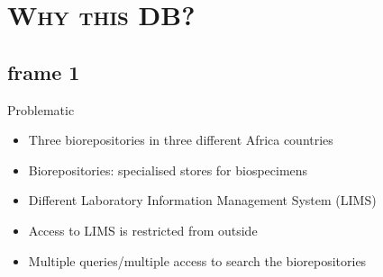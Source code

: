 \documentclass[xcolor=x11names,compress]{beamer}
\renewcommand{\(}{\begin{columns}}
\renewcommand{\)}{\end{columns}}
\newcommand{\<}[1]{\begin{column}{#1}}
\renewcommand{\>}{\end{column}}
\begin{document}
\section{\scshape Why this DB?}


\subsection{frame 1}
\begin{frame}{Problematic}
\begin{itemize}
\item Three biorepositories in three different Africa countries
\item Biorepositories: specialised stores for biospecimens
\item Different Laboratory Information Management System (LIMS) 
\item Access to LIMS is restricted from outside
\item Multiple queries/multiple access to search the biorepositories 
\end{itemize}
\end{frame}

\end{document}
